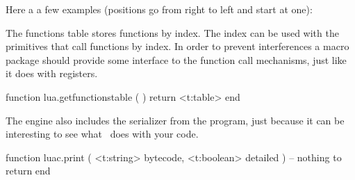 Here a a few examples (positions go from right to left and start at one):

\protected{}

\starttabulate[|lT|r|]
\stoptabulate

\stopsubsection

\startsubsection[title=Functions]

The functions table stores functions by index. The index can be used with the
primitives that call functions by index. In order to prevent interferences a
macro package should provide some interface to the function call mechanisms, just
like it does with registers.

\starttyping[option=LUA]
function lua.getfunctionstable ( )
    return <t:table>
end
\stoptyping

\stopsubsection

\startsubsection[title=Tracing]

The engine also includes the serializer from the  program, just
because it can be interesting to see what \LUA\ does with your code.

\starttyping[option=LUA]
function luac.print ( <t:string> bytecode, <t:boolean> detailed )
    -- nothing to return
end
\stoptyping

\stopsubsection

\stopsection

\stopdocument

